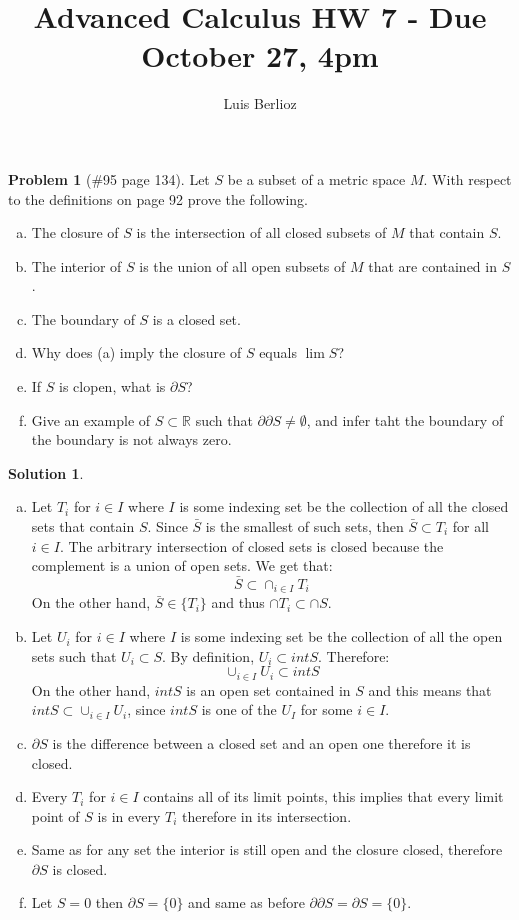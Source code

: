\documentclass{article}
\theoremstyle{definition}
\newtheorem*{soln}{Solution}
\newtheorem*{prob}{Problem}
\theoremstyle{theorem}
\newcommand{\R}{\mathbb{R}}
\newcommand{\E}{\mathbb{\emptyset}}
\begin{document}
\title{Advanced Calculus HW 7 - Due October 27, 4pm}
\author{Luis Berlioz}
\maketitle



\begin{prob}[\#95 page 134]
    Let $S$ be a subset of a metric space $M$. With respect to the definitions on page 92 prove the following.
    \begin{enumerate}[(a)]
        \item The closure of $S$ is the intersection of all closed subsets of $M$ that contain $S$.
        \item The interior of $S$ is the union of all open subsets of $M$ that are contained in $S$.
        \item The boundary of $S$ is a closed set.
        \item Why does (a) imply the closure of $S$ equals $\lim S$?
        \item If $S$ is clopen, what is $\partial S$?
        \item Give an example of $S\subset \R$ such that $\partial\partial S\neq \E$, and infer taht the boundary of the boundary is not always zero.
    \end{enumerate}
\end{prob}
\begin{soln}
    \begin{enumerate}[(a)]
        \item Let $T_i$ for $i\in I$ where $I$ is some indexing set be the collection of all the closed sets that contain $S$. Since $\bar S$ is the smallest of such sets, then $\bar S\subset T_i$ for all $i\in I$. The arbitrary intersection of closed sets is closed because the complement is a union of open sets. We get that:
            $$\bar S \subset \cap_{i\in I } T_i$$
            On the other hand, $\bar S\in\{T_i  \}$ and thus $\cap T_i\subset \cap S$.
        \item Let $U_i$ for $i \in I$ where $I$ is some indexing set be the collection of all the open sets such that  $U_i \subset S$. By definition, $U_i \subset int S$. Therefore:
            $$\cup_{i\in I }U_i \subset int S$$
            On the other hand, $int S $ is an open set contained in $S$ and this means that $int S \subset \cup_{i\in I }U_i $, since $int S$ is one of the $U_I$ for some $i \in I$.
        \item $\partial S$ is the difference between a closed set and an open one therefore it is closed.
        \item Every $T_i$ for $i\in I$ contains all of its limit points, this implies that every limit point of $S$ is in every $T_i$ therefore in its intersection.
        \item Same as for any set the interior is still open and the closure closed, therefore $\partial S$ is closed.
        \item Let $S={0}$ then $\partial S = \{0  \}$ and same as before $\partial\partial S= \partial S = \{0  \}$.
    \end{enumerate}
\end{soln}
\end{document}

